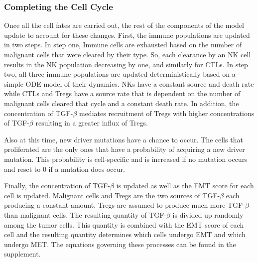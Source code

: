 \documentclass[11pt]{article}
\begin{document}
\subsubsection{Completing the Cell Cycle}
Once all the cell fates are carried out, the rest of the components of the model update to account for these changes.
First, the immune populations are updated in two steps.
In step one, Immune cells are exhausted based on the number of malignant cells that were cleared by their type.
So, each clearance by an NK cell results in the NK population decreasing by one, and similarly for CTLs.
In step two, all three immune populations are updated deterministically based on a simple ODE model of their dynamics.
NKs have a constant source and death rate while CTLs and Tregs have a source rate that is dependent on the number of malignant cells cleared that cycle and a constant death rate.
In addition, the concentration of TGF-$\beta$ mediates recruitment of Tregs with higher concentrations of TGF-$\beta$ resulting in a greater influx of Tregs.
\par
Also at this time, new driver mutations have a chance to occur.
The cells that proliferated are the only ones that have a probability of acquiring a new driver mutation.
This probability is cell-specific and is increased if no mutation occurs and reset to 0 if a mutation does occur.
\par
Finally, the concentration of TGF-$\beta$ is updated as well as the EMT score for each cell is updated.
Malignant cells and Tregs are the two sources of TGF-$\beta$ each producing a constant amount.
Tregs are assumed to produce much more TGF-$\beta$ than malignant cells.
The resulting quantity of TGF-$\beta$ is divided up randomly among the tumor cells.
This quantity is combined with the EMT score of each cell and the resulting quantity determines which cells undergo EMT and which undergo MET.
The equations governing these processes can be found in the supplement.
\end{document}
